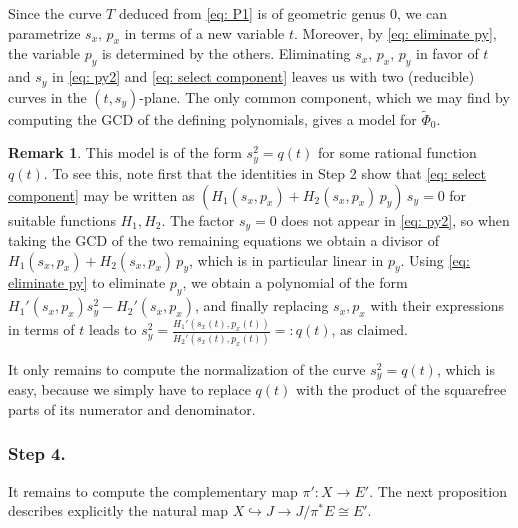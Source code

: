 \documentclass[a4paper,twoside,english]{amsart}
\theoremstyle{plain}
\theoremstyle{definition}
\newtheorem{remark}[theorem]{Remark}
\begin{document}
    Since the curve $T$ deduced from \eqref{eq: P1} is of geometric genus $0$, we can parametrize $s_x,\, p_x$ in terms of a new variable $t$. Moreover, by \eqref{eq: eliminate py}, the variable $p_y$ is determined by the others. Eliminating $s_x,\, p_x,\, p_y$ in favor of $t$ and $s_y$ in \eqref{eq: py2} and \eqref{eq: select component} leaves us with two (reducible) curves in the $(t, s_y)$-plane. The only common component, which we may find by computing the GCD of the defining polynomials, gives a model for $\tilde{\Phi}_0$. 
    \begin{remark}\label{rmk: form of the model}
    This model is of the form $s_y^2=q(t)$ for some rational function $q(t)$. To see this, note first that the identities in Step 2 show that \eqref{eq: select component} may be written as $\left(H_1(s_x, p_x)  + H_2(s_x, p_x) \, p_y\right) \, s_y=0$ for suitable functions $H_1, H_2$. The factor $s_y=0$ does not appear in \eqref{eq: py2}, so when taking the GCD of the two remaining equations we obtain a divisor of $H_1(s_x, p_x)  + H_2(s_x, p_x) \, p_y$, which is in particular linear in $p_y$. Using \eqref{eq: eliminate py} to eliminate $p_y$, we obtain a polynomial of the form $H_1'(s_x, p_x) s_y^2 - H_2'(s_x,p_x)$, and finally replacing $s_x, p_x$ with their expressions in terms of $t$ leads to $s_y^2 = \frac{H_1'(s_x(t), p_x(t))}{H_2'(s_x(t), p_x(t))} =: q(t)$, as claimed.
    \end{remark}
    It only remains to compute the normalization of the curve $s_y^2 = q(t)$, which is easy, because we simply have to replace $q(t)$ with the product of the squarefree parts of its numerator and denominator.



\subsubsection{Step 4.}
It remains to compute the complementary map $\pi' : X \to E'$. The next proposition describes explicitly the natural map $X \hookrightarrow J \to J/\pi^*E \cong E'$.
\end{document}
